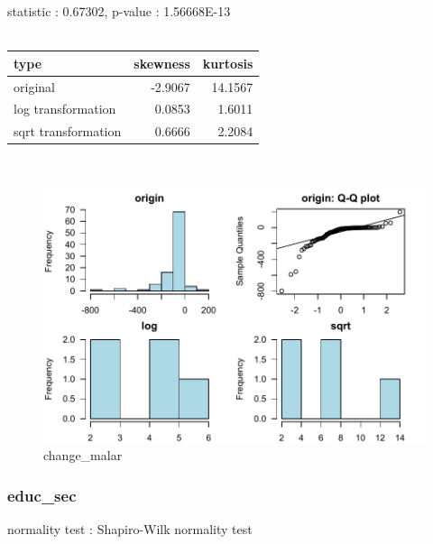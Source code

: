 \documentclass{book}\usepackage[]{graphicx}\usepackage[]{color}
\begin{document}
\noindent statistic : 0.67302,  p-value : 1.56668E-13\\
\\%
\begin{tabular}{lrr}
  \toprule
type & skewness & kurtosis \\ 
  \midrule
original & -2.9067 & 14.1567 \\ 
  log transformation & 0.0853 & 1.6011 \\ 
  sqrt transformation & 0.6666 & 2.2084 \\ 
   \bottomrule
\end{tabular}
\\
\begin{figure}[!ht]
\centering
\includegraphics[width=1.0\textwidth]{figure/norm7.pdf}
\caption{change\_malar}
\end{figure}
\clearpage
\subsubsection{ educ\_sec }

normality test : Shapiro-Wilk normality test
\end{document}
